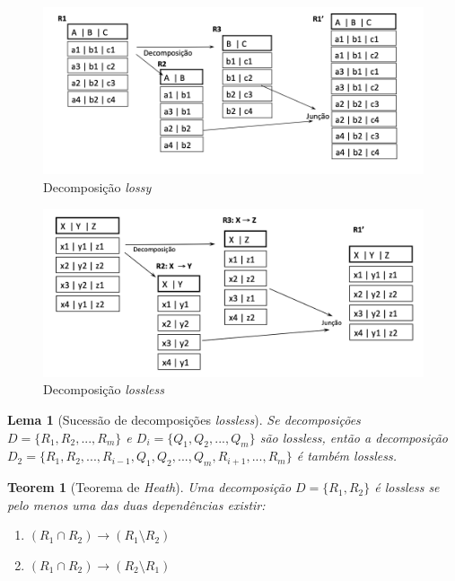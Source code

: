 \documentclass[oneside]{book}
\newtheorem{theorem}{Teorem}
\newtheorem{lemma}{Lema}
\theoremstyle{definition}
\begin{document}
\begin{figure}[h]
    \centering
    \includegraphics[scale = 0.75]{cap_norm/lossy.png}
    \caption{Decomposição \textit{lossy}}
\end{figure}

\begin{figure}[h]
    \centering
    \includegraphics[scale = 0.75]{cap_norm/lossless.png}
    \caption{Decomposição \textit{lossless}}
\end{figure}

\begin{lemma} [Sucessão de decomposições \textit{lossless}]
    Se decomposições $D = \{R_1, R_2, ..., R_m\}$ e $D_i = \{Q_1, Q_2, ..., Q_m\}$ são \textit{lossless}, então a decomposição $D_2 = \{ R_1, R_2, ..., R_{i - 1}, Q_1, Q_2, ..., Q_m, R_{i + 1}, ...,  R_m\}$ é também \textit{lossless}.
\end{lemma}

\begin{theorem} [Teorema de \textit{Heath}]
    Uma decomposição $D = \{R_1, R_2\}$ é \textit{lossless} se pelo menos uma das duas dependências existir:
    \begin{enumerate}
        \item $(R_1 \cap R_2) \rightarrow (R_1 \setminus R_2)$
        \item  $(R_1 \cap R_2) \rightarrow (R_2 \setminus R_1)$
    \end{enumerate}
\end{theorem}
\end{document}
